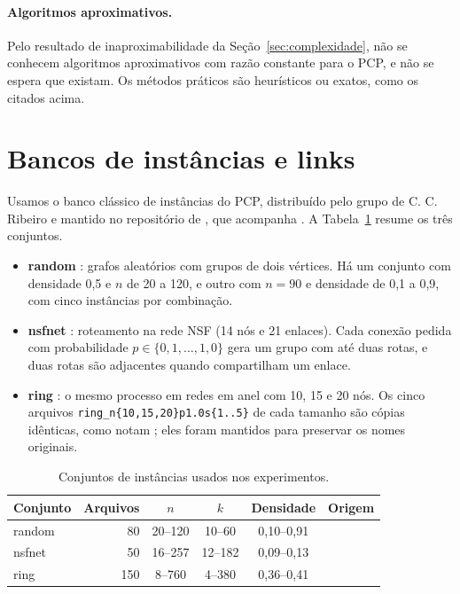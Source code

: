 \documentclass[12pt]{article}
\begin{document}
\paragraph{Algoritmos aproximativos.} Pelo resultado de inaproximabilidade da
Seção~\ref{sec:complexidade}, não se conhecem algoritmos aproximativos com
razão constante para o PCP, e não se espera que existam. Os métodos práticos
são heurísticos ou exatos, como os citados acima.

\section{Bancos de instâncias e links}\label{sec:instancias}

Usamos o banco clássico de instâncias do PCP, distribuído pelo grupo de C. C.
Ribeiro e mantido no repositório de \cite{santini2017}, que acompanha
\cite{furini2018}. A Tabela~\ref{tab:instancias} resume os três conjuntos.

\begin{itemize}
  \item \textbf{random} \cite{frota2010}: grafos aleatórios com grupos de dois
    vértices. Há um conjunto com densidade 0,5 e $n$ de 20 a 120, e outro com
    $n=90$ e densidade de 0,1 a 0,9, com cinco instâncias por combinação.
  \item \textbf{nsfnet} \cite{li2000}: roteamento na rede NSF (14 nós e 21
    enlaces). Cada conexão pedida com probabilidade $p\in\{0{,}1,\dots,1{,}0\}$
    gera um grupo com até duas rotas, e duas rotas são adjacentes quando
    compartilham um enlace.
  \item \textbf{ring} \cite{frota2010}: o mesmo processo em redes em anel com
    10, 15 e 20 nós. Os cinco arquivos \texttt{ring\_n\{10,15,20\}p1.0s\{1..5\}}
    de cada tamanho são cópias idênticas, como notam \cite{furini2018}; eles
    foram mantidos para preservar os nomes originais.
\end{itemize}

\begin{table}[ht]
  \centering
  \caption{Conjuntos de instâncias usados nos experimentos.}
  \label{tab:instancias}
  \begin{tabular}{lrcccl}
    \toprule
    Conjunto & Arquivos & $n$ & $k$ & Densidade & Origem \\
    \midrule
    random & 80  & 20--120 & 10--60  & 0,10--0,91 & \cite{frota2010} \\
    nsfnet & 50  & 16--257 & 12--182 & 0,09--0,13 & \cite{li2000} \\
    ring   & 150 & 8--760  & 4--380  & 0,36--0,41 & \cite{frota2010} \\
    \bottomrule
  \end{tabular}
\end{table}
\end{document}

